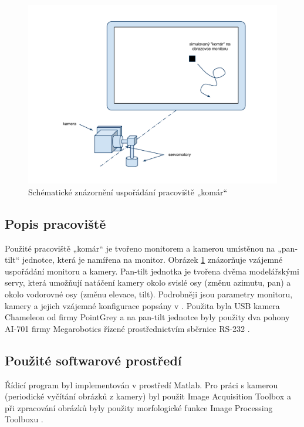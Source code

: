 \documentclass[a4paper,10pt]{article}
\begin{document}
		\begin{figure}[!h]
			\centering
			 \includegraphics[width=1\columnwidth]{pics/usporadani_pracoviste}
			 \caption{Schématické znázornění uspořádání pracoviště „komár“}\label{fig:usporadaniPracoviste}
		\end{figure}

	\subsection{Popis pracoviště}

		Použité pracoviště „komár“ je tvořeno monitorem a kamerou umístěnou na „pan-tilt“ jednotce, která je namířena
		na monitor. Obrázek \ref{fig:usporadaniPracoviste} znázorňuje vzájemné uspořádání monitoru a kamery.
		Pan-tilt jednotka je tvořena dvěma mo\-de\-lář\-ský\-mi servy, která umožňují natáčení kamery okolo svislé osy
		(změnu azimutu, pan) a okolo vodorovné osy (změnu elevace, tilt).
		Podrobněji jsou parametry monitoru, kamery a jejich vzájemné konfigurace popsány v \cite{kamera}.
		Použita byla USB kamera Chameleon od firmy PointGrey \cite{kameraDatasheet} a na pan-tilt jednotce byly
		použity dva pohony AI-701 firmy Megarobotics řízené prostřednictvím sběrnice RS-232 \cite{servaManual}.

	\subsection{Použité softwarové prostředí}

		Řídicí program byl implementován v prostředí Matlab. Pro práci s kamerou (periodické vyčítání
		obrázků z kamery) byl použit Image Acquisition Toolbox \cite{imaq} a při zpracování obrázků
		byly použity morfologické funkce Image Processing Toolboxu \cite{imageProcessingToolbox}.
\end{document}
